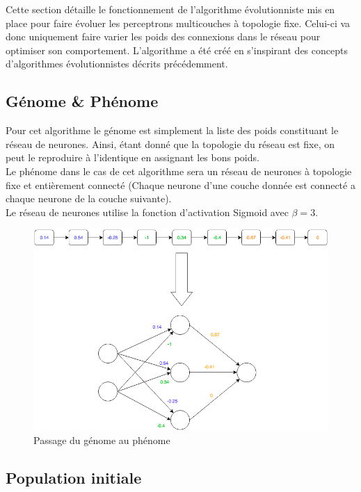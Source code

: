 \documentclass{article}
\begin{document}
Cette section détaille le fonctionnement de l'algorithme évolutionniste mis en place pour faire évoluer les perceptrons multicouches à topologie fixe. Celui-ci va donc uniquement faire varier les poids des connexions dans le réseau pour optimiser son comportement. L'algorithme a été créé en s'inspirant des concepts d'algorithmes évolutionnistes décrits précédemment.

\subsection{Génome \& Phénome}

Pour cet algorithme le génome est simplement la liste des poids constituant le réseau de neurones. Ainsi, étant donné que la topologie du réseau est fixe, on peut le reproduire à l'identique en assignant les bons poids.\\

Le phénome dans le cas de cet algorithme sera un réseau de neurones à topologie fixe et entièrement connecté (Chaque neurone d'une couche donnée est connecté a chaque neurone de la couche suivante).\\

Le réseau de neurones utilise la fonction d'activation Sigmoid avec $\beta = 3$.

\begin{figure}[H]
\begin{center}
	\includegraphics[scale=0.5]{genomephenome.png}
	\caption{Passage du génome au phénome}
\end{center}
\end{figure}

\subsection{Population initiale}
\end{document}
